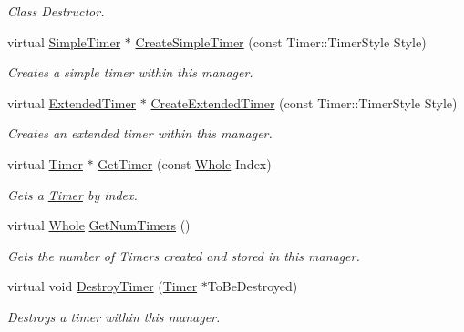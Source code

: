 \begin{DoxyCompactItemize}
\begin{DoxyCompactList}\small\item\em Class Destructor. \item\end{DoxyCompactList}\item 
virtual \hyperlink{classphys_1_1SimpleTimer}{SimpleTimer} $\ast$ \hyperlink{classphys_1_1TimerManager_a7d666a65aee80dd354dfdd6de671e186}{CreateSimpleTimer} (const Timer::TimerStyle Style)
\begin{DoxyCompactList}\small\item\em Creates a simple timer within this manager. \item\end{DoxyCompactList}\item 
virtual \hyperlink{classphys_1_1ExtendedTimer}{ExtendedTimer} $\ast$ \hyperlink{classphys_1_1TimerManager_a44ba4749b2ca6c31994813e97f88ec79}{CreateExtendedTimer} (const Timer::TimerStyle Style)
\begin{DoxyCompactList}\small\item\em Creates an extended timer within this manager. \item\end{DoxyCompactList}\item 
virtual \hyperlink{classphys_1_1Timer}{Timer} $\ast$ \hyperlink{classphys_1_1TimerManager_a5e2912df5f17cd8af1ab8457b95c5a75}{GetTimer} (const \hyperlink{namespacephys_a460f6bc24c8dd347b05e0366ae34f34a}{Whole} Index)
\begin{DoxyCompactList}\small\item\em Gets a \hyperlink{classphys_1_1Timer}{Timer} by index. \item\end{DoxyCompactList}\item 
virtual \hyperlink{namespacephys_a460f6bc24c8dd347b05e0366ae34f34a}{Whole} \hyperlink{classphys_1_1TimerManager_a70ea3a58c3b71cd79a3e9a8b0f069dd5}{GetNumTimers} ()
\begin{DoxyCompactList}\small\item\em Gets the number of Timers created and stored in this manager. \item\end{DoxyCompactList}\item 
virtual void \hyperlink{classphys_1_1TimerManager_ae2dc6385cf9997aacd61ea5a0f9f1c66}{DestroyTimer} (\hyperlink{classphys_1_1Timer}{Timer} $\ast$ToBeDestroyed)
\begin{DoxyCompactList}\small\item\em Destroys a timer within this manager. \item\end{DoxyCompactList}\item 

\end{DoxyCompactItemize}

